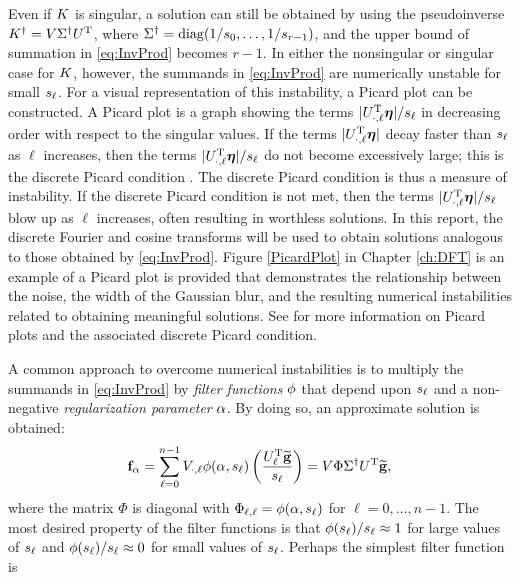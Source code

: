 Even if $K$ is singular, a solution can still be obtained by using the pseudoinverse $K^\dagger = V{\Sigma^\dagger}U^{\mathrm{T}}$, where $\Sigma^\dagger = \operatorname{diag}(1/s_0,\ldots,1/s_{r-1})$, and the upper bound of summation in \eqref{eq:InvProd} becomes $r-1$. In either the nonsingular or singular case for $K$, however, the summands in \eqref{eq:InvProd} are numerically unstable for small $s_\ell$. For a visual representation of this instability, a Picard plot can be constructed. A Picard plot is a graph showing the terms $|U^{\mathrm{T}}_{\cdot,\ell}\bm{\eta}|/s_\ell$ in decreasing order with respect to the singular values. If the terms $|U^{\mathrm{T}}_{\cdot,\ell}\bm{\eta}|$ decay faster than $s_\ell$ as $\ell$ increases, then the terms $|U^{\mathrm{T}}_{\cdot,\ell}\bm{\eta}|/s_\ell$ do not become excessively large; this is the discrete Picard condition \cite{ABT}. The discrete Picard condition is thus a measure of instability. If the discrete Picard condition is not met, then the terms $|U^{\mathrm{T}}_{\cdot,\ell}\bm{\eta}|/s_\ell$ blow up as $\ell$ increases, often resulting in worthless solutions. In this report, the discrete Fourier and cosine transforms will be used to obtain solutions analogous to those obtained by \eqref{eq:InvProd}. Figure \ref{PicardPlot} in Chapter \ref{ch:DFT} is an example of a Picard plot is provided that demonstrates the relationship between the noise, the width of the Gaussian blur, and the resulting numerical instabilities related to obtaining meaningful solutions. See \cite{Hansen1990} for more information on Picard plots and the associated discrete Picard condition. \par 
A common approach to overcome numerical instabilities is to multiply the summands in \eqref{eq:InvProd} by \textit{filter functions} $\phi$ that depend upon $s_\ell$ and a non-negative \textit{regularization parameter} $\alpha$. By doing so, an approximate solution is obtained:
\begin{equation}
\mathbf{f}_\alpha = \sum_{\ell = 0}^{n-1} V_{\cdot,\ell}\phi(\alpha,s_\ell)\left(\frac{{U^{\mathrm{T}}_\ell}\widetilde{\mathbf{g}}}{s_\ell}\right) = V\Phi\Sigma^\dagger U^{\mathrm{T}}\widetilde{\mathbf{g}},
\label{eq:ApproxSol}
\end{equation}
where the matrix $\Phi$ is diagonal with $\Phi_{\ell,\ell} = \phi(\alpha,s_\ell)$ for $\ell = 0,\ldots,{n-1}$. The most desired property of the filter functions is that $\phi(s_\ell)/s_\ell \approx 1$  for large values of $s_\ell$ and $\phi(s_\ell)/s_\ell \approx 0$ for small values of $s_\ell$.  Perhaps the simplest filter function is
